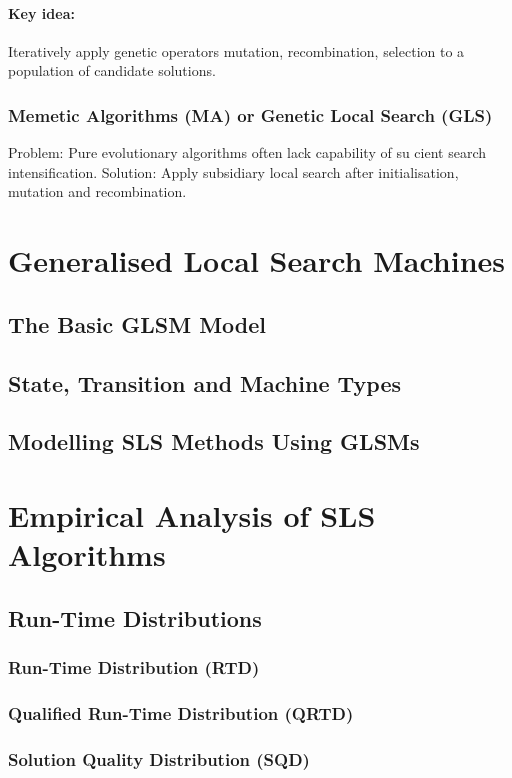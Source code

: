 \documentclass[a4paper,10pt]{article}
\begin{document}
\paragraph{Key idea:} Iteratively apply genetic operators mutation, recombination, selection to a population of candidate solutions.

\subsubsection{Memetic Algorithms (MA) or Genetic Local Search (GLS)}
		Problem: Pure evolutionary algorithms often lack capability of su cient search intensification.
Solution: Apply subsidiary local search after initialisation, mutation and recombination.
		
		
		
		

\section{Generalised Local Search Machines}
	\subsection{The Basic GLSM Model}
	\subsection{State, Transition and Machine Types}
	\subsection{Modelling SLS Methods Using GLSMs}

\section{Empirical Analysis of SLS Algorithms}
	\subsection{Run-Time Distributions}
	\subsubsection{Run-Time Distribution (RTD)}
	\subsubsection{Qualified Run-Time Distribution (QRTD)}
	\subsubsection{Solution Quality Distribution (SQD)}
\end{document}

